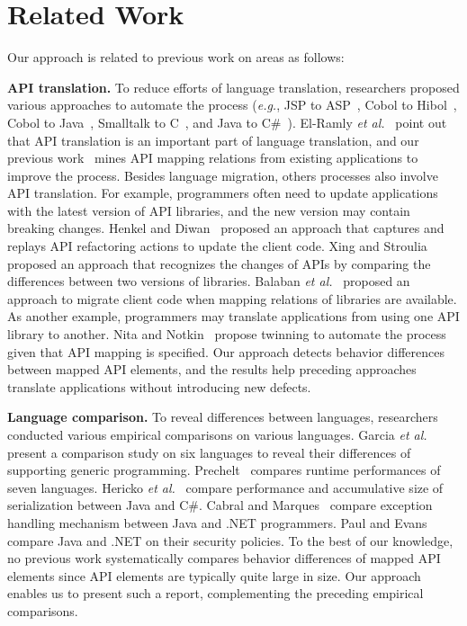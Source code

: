 \section{Related Work}
\label{sec:related}

Our approach is related to previous work on areas as follows:

\textbf{API translation.} To reduce efforts of language translation, researchers proposed various
approaches to automate the process (\emph{e.g.}, JSP to ASP~\cite{hassan2005lightweight}, Cobol to Hibol~\cite{waters1988program}, Cobol to Java~\cite{mossienko2003automated}, Smalltalk to C~\cite{yasumatsu1995spice}, and Java to C\#~\cite{el2006experiment}). El-Ramly \emph{et al.}~\cite{el2006experiment} point out that API translation is an important part of language translation, and our previous work~\cite{zhong2010mining} mines API mapping relations from existing applications to improve the process. Besides language migration, others processes also involve API translation. For example, programmers often need to update applications with the latest version of API libraries, and the new version may contain breaking changes. Henkel and Diwan~\cite{henkel2005catchup} proposed an approach that captures and replays API refactoring actions to update the client code. Xing and Stroulia~\cite{xing2007api} proposed an approach that recognizes the changes of APIs by comparing the differences between two versions of libraries. Balaban \emph{et al.}~\cite{balaban2005refactoring} proposed an approach to migrate client code when mapping relations of libraries are available. As another example, programmers may translate applications from using one API library to another. Nita and Notkin~\cite{nita2010using} propose twinning to automate the process given that API mapping is specified. Our approach detects behavior differences between mapped API elements, and the results help preceding approaches translate applications without introducing new defects.

\textbf{Language comparison.} To reveal differences between languages, researchers conducted various empirical comparisons on various languages. Garcia \emph{et al.}~\cite{Garcia2003} present a comparison study on six languages to reveal their differences of supporting generic programming. Prechelt~\cite{prechelt2000empirical} compares runtime performances of seven languages. Hericko \emph{et al.}~\cite{944589} compare performance and accumulative size of serialization between Java and C\#. Cabral and Marques~\cite{cabral2007exception} compare exception handling mechanism between Java and .NET programmers. Paul and Evans~\cite{paul2006comparing} compare Java and .NET on their security policies. To the best of our knowledge, no previous work systematically compares behavior differences of mapped API elements since API elements are typically quite large in size. Our approach enables us to present such a report, complementing the preceding empirical comparisons.

